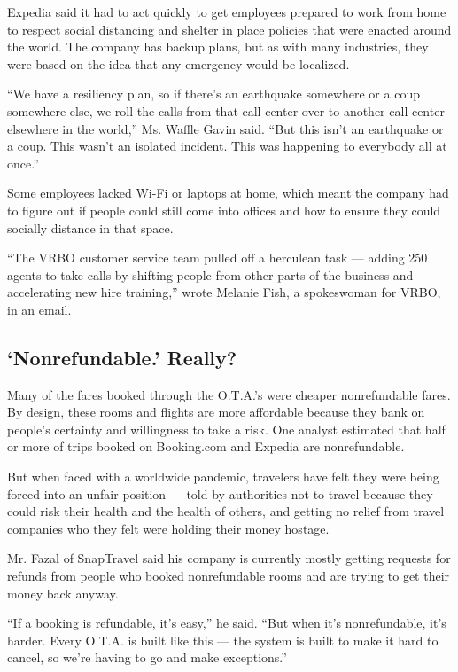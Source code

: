 Expedia said it had to act quickly to get employees prepared to work
from home to respect social distancing and shelter in place policies
that were enacted around the world. The company has backup plans, but as
with many industries, they were based on the idea that any emergency
would be localized.

``We have a resiliency plan, so if there's an earthquake somewhere or a
coup somewhere else, we roll the calls from that call center over to
another call center elsewhere in the world,'' Ms. Waffle Gavin said.
``But this isn't an earthquake or a coup. This wasn't an isolated
incident. This was happening to everybody all at once.''

Some employees lacked Wi-Fi or laptops at home, which meant the company
had to figure out if people could still come into offices and how to
ensure they could socially distance in that space.

``The VRBO customer service team pulled off a herculean task --- adding
250 agents to take calls by shifting people from other parts of the
business and accelerating new hire training,'' wrote Melanie Fish, a
spokeswoman for VRBO, in an email.

\hypertarget{nonrefundable-really}{%
\subsection{`Nonrefundable.' Really?}\label{nonrefundable-really}}

Many of the fares booked through the O.T.A.'s were cheaper nonrefundable
fares. By design, these rooms and flights are more affordable because
they bank on people's certainty and willingness to take a risk. One
analyst estimated that half or more of trips booked on Booking.com and
Expedia are nonrefundable.

But when faced with a worldwide pandemic, travelers have felt they were
being forced into an unfair position --- told by authorities not to
travel because they could risk their health and the health of others,
and getting no relief from travel companies who they felt were holding
their money hostage.

Mr. Fazal of SnapTravel said his company is currently mostly getting
requests for refunds from people who booked nonrefundable rooms and are
trying to get their money back anyway.

``If a booking is refundable, it's easy,'' he said. ``But when it's
nonrefundable, it's harder. Every O.T.A. is built like this --- the
system is built to make it hard to cancel, so we're having to go and
make exceptions.''

